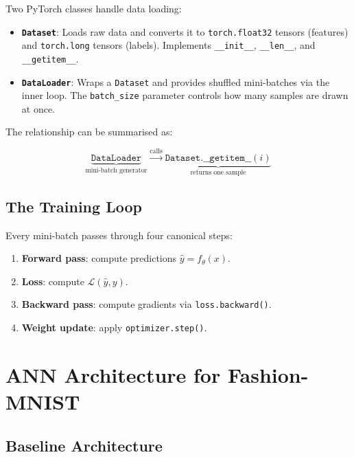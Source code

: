 \documentclass[12pt,a4paper]{article}
\begin{document}
Two PyTorch classes handle data loading:

\begin{itemize}
  \item \textbf{\texttt{Dataset}}: Loads raw data and converts it to
        \texttt{torch.float32} tensors (features) and \texttt{torch.long}
        tensors (labels).  Implements \texttt{\_\_init\_\_},
        \texttt{\_\_len\_\_}, and \texttt{\_\_getitem\_\_}.
  \item \textbf{\texttt{DataLoader}}: Wraps a \texttt{Dataset} and provides
        shuffled mini-batches via the inner loop.  The \texttt{batch\_size}
        parameter controls how many samples are drawn at once.
\end{itemize}

The relationship can be summarised as:

\[
  \underbrace{\texttt{DataLoader}}_{\text{mini-batch generator}}
  \xrightarrow{\text{calls}}
  \underbrace{\texttt{Dataset.\_\_getitem\_\_}(i)}_{\text{returns one sample}}
\]

\subsection{The Training Loop}
\label{sec:background:loop}

Every mini-batch passes through four canonical steps:

\begin{enumerate}
  \item \textbf{Forward pass}: compute predictions $\hat{y} = f_\theta(x)$.
  \item \textbf{Loss}: compute $\mathcal{L}(\hat{y}, y)$.
  \item \textbf{Backward pass}: compute gradients via
        \texttt{loss.backward()}.
  \item \textbf{Weight update}: apply \texttt{optimizer.step()}.
\end{enumerate}

\section{ANN Architecture for Fashion-MNIST}
\label{sec:ann_arch}

\subsection{Baseline Architecture}
\label{sec:ann_arch:baseline}
\end{document}
